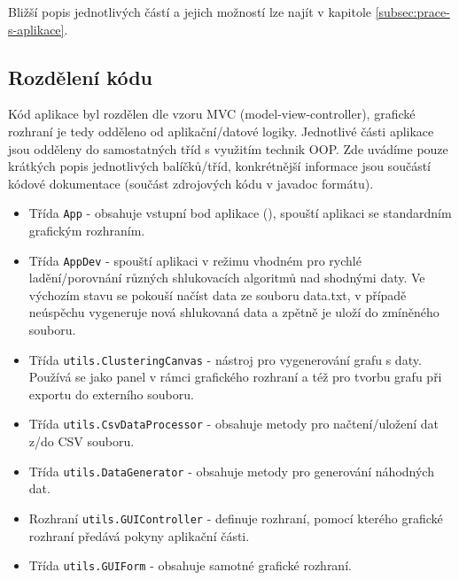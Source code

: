 \documentclass[pdftex,a4paper]{article}
\begin{document}
Bližší popis jednotlivých částí a jejich možností lze najít v kapitole \ref{subsec:prace-s-aplikace}.



\subsection{Rozdělení kódu}
Kód aplikace byl rozdělen dle vzoru MVC (model-view-controller), grafické rozhraní je tedy odděleno od aplikační/datové logiky. Jednotlivé části aplikace jsou odděleny do samostatných tříd s využitím technik OOP. Zde uvádíme pouze krátkých popis jednotlivých balíčků/tříd, konkrétnější informace jsou součástí kódové dokumentace (součást zdrojových kódu v javadoc formátu).

\begin{itemize}
	\item Třída \texttt{App} - obsahuje vstupní bod aplikace (), spouští aplikaci se standardním grafickým rozhraním.
	
	\item Třída \texttt{AppDev} - spouští aplikaci v režimu vhodném pro rychlé ladění/porovnání různých shlukovacích algoritmů nad shodnými daty. Ve výchozím stavu se pokouší načíst data ze souboru data.txt, v případě neúspěchu vygeneruje nová shlukovaná data a zpětně je uloží do zmíněného souboru.
\end{itemize}

\medskip

\begin{itemize}
	\item Třída \texttt{utils.ClusteringCanvas} - nástroj pro vygenerování grafu s daty. Používá se jako panel v rámci grafického rozhraní a též pro tvorbu grafu při exportu do externího souboru.
	
	\item Třída \texttt{utils.CsvDataProcessor} - obsahuje metody pro načtení/uložení dat z/do CSV souboru.
	
	\item Třída \texttt{utils.DataGenerator} - obsahuje metody pro generování náhodných dat.
	
	\item Rozhraní \texttt{utils.GUIController} - definuje rozhraní, pomocí kterého grafické rozhraní předává pokyny aplikační části.
	
	\item Třída \texttt{utils.GUIForm} - obsahuje samotné grafické rozhraní.
\end{itemize}
\end{document}
